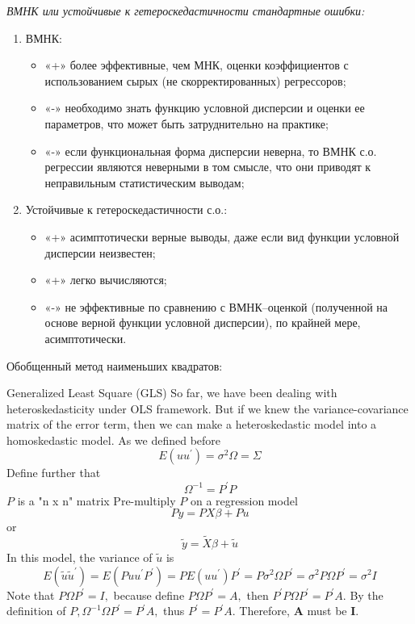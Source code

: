 \documentclass[a4paper,8pt]{article} %
\begin{document}
\textit{ВМНК или устойчивые к гетероскедастичности
стандартные ошибки: }

\begin{enumerate}
	\item ВМНК:
	\begin{itemize}
		\item «+» более эффективные, чем МНК, оценки коэффициентов с использованием сырых
	(не скорректированных) регрессоров;
	\item  «-» необходимо знать функцию условной дисперсии и оценки ее параметров, что
	может быть затруднительно на практике;
	\item  «-» если функциональная форма дисперсии неверна, то ВМНК с.о. регрессии
	являются неверными в том смысле, что они приводят к неправильным
	статистическим выводам;
	\end{itemize}
	\item  Устойчивые к гетероскедастичности с.о.:
	\begin{itemize}
		\item «+» асимптотически верные выводы, даже если вид функции условной дисперсии
	неизвестен;
	\item  «+» легко вычисляются;
	\item  «-» не эффективные по сравнению с ВМНК–оценкой (полученной на основе верной
	функции условной дисперсии), по крайней мере, асимптотически.
	\end{itemize}
\end{enumerate}

%

Обобщенный метод наименьших квадратов: 

Generalized Least Square (GLS)
So far, we have been dealing with heteroskedasticity under OLS framework. But if we knew the variance-covariance matrix of the error term, then we can make a heteroskedastic model into a homoskedastic model.
As we defined before
$$
E\left(u u^{\prime}\right)=\sigma^{2} \Omega=\Sigma
$$
Define further that
$$
\Omega^{-1}=P^{\prime} P
$$
$P$ is a "n x n" matrix
Pre-multiply $P$ on a regression model
$$
P y=P X \beta+P u
$$
or
$$
\tilde{y}=\tilde{X} \beta+\tilde{u}
$$
In this model, the variance of $\tilde{u}$ is
$$
E\left(\tilde{u} \tilde{u}^{\prime}\right)=E\left(P u u^{\prime} P^{\prime}\right)=P E\left(u u^{\prime}\right) P^{\prime}=P \sigma^{2} \Omega P^{\prime}=\sigma^{2} P \Omega P^{\prime}=\sigma^{2} I
$$
Note that $P \Omega P^{\prime}=I,$ because define $P \Omega P^{\prime}=A,$ then $P^{\prime} P \Omega P^{\prime}=P^{\prime} A .$ By the definition of $P, \Omega^{-1} \Omega P^{\prime}=P^{\prime} A,$ thus $P^{\prime}=P^{\prime} A .$ Therefore, $\boldsymbol{A}$ must be $\boldsymbol{I} .$
\end{document}
